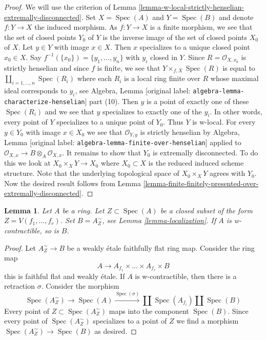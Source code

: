 \documentclass[10pt,a4paper]{article}
\theoremstyle{plain}
\newtheorem{lemma}[subsection]{Lemma}
\theoremstyle{definition}
\theoremstyle{remark}
\numberwithin{equation}{subsection}
\def\Spec{\mathop{\mathrm{Spec}}}
\begin{document}
\begin{proof}
We will use the criterion of
Lemma \ref{lemma-w-local-strictly-henselian-extremally-disconnected}.
Set $X = \Spec(A)$ and $Y = \Spec(B)$ and denote $f : Y \to X$
the induced morphism.
As $f : Y \to X$ is a finite morphism, we see that the set of closed
points $Y_0$ of $Y$ is the inverse image of the set of closed points
$X_0$ of $X$. Let $y \in Y$ with image $x \in X$. Then
$x$ specializes to a unique closed point $x_0 \in X$.
Say $f^{-1}(\{x_0\}) = \{y_1, \ldots, y_n\}$ with $y_i$
closed in $Y$. Since $R = \mathcal{O}_{X, x_0}$ is strictly henselian
and since $f$ is finite, we see that $Y \times_{f, X} \Spec(R)$ is
equal to $\coprod_{i = 1, \ldots, n} \Spec(R_i)$ where
each $R_i$ is a local ring finite over $R$
whose maximal ideal corresponds to $y_i$, see
Algebra, Lemma \textnormal{[original label: \nolinkurl{algebra-lemma-characterize-henselian}]} part (10).
Then $y$ is a point of exactly one of these $\Spec(R_i)$
and we see that $y$ specializes to exactly one of the $y_i$.
In other words, every point of $Y$ specializes to a unique
point of $Y_0$. Thus $Y$ is w-local.
For every $y \in Y_0$ with image $x \in X_0$
we see that $\mathcal{O}_{Y, y}$ is strictly henselian by
Algebra, Lemma \textnormal{[original label: \nolinkurl{algebra-lemma-finite-over-henselian}]}
applied to $\mathcal{O}_{X, x} \to B \otimes_A \mathcal{O}_{X, x}$.
It remains to show that $Y_0$ is extremally disconnected.
To do this we look at $X_0 \times_X Y \to X_0$
where $X_0 \subset X$ is the reduced induced scheme structure.
Note that the underlying topological space of
$X_0 \times_X Y$ agrees with $Y_0$. Now the desired result follows from
Lemma \ref{lemma-finite-finitely-presented-over-extremally-disconnected}.
\end{proof}

\begin{lemma}
\label{lemma-localization-w-contractible}
Let $A$ be a ring. Let $Z \subset \Spec(A)$ be a closed subset
of the form $Z = V(f_1, \ldots, f_r)$. Set $B = A_Z^\sim$, see
Lemma \ref{lemma-localization}. If $A$ is w-contractible, so is $B$.
\end{lemma}

\begin{proof}
Let $A_Z^\sim \to B$ be a weakly \'etale faithfully flat ring map.
Consider the ring map
$$
A \longrightarrow A_{f_1} \times \ldots \times A_{f_r} \times B
$$
this is faithful flat and weakly \'etale. If $A$ is w-contractible,
then there is a retraction $\sigma$. Consider the morphism
$$
\Spec(A_Z^\sim) \to \Spec(A) \xrightarrow{\Spec(\sigma)}
\coprod \Spec(A_{f_i}) \amalg \Spec(B)
$$
Every point of $Z \subset \Spec(A_Z^\sim)$ maps into the component
$\Spec(B)$. Since every point of $\Spec(A_Z^\sim)$ specializes to a
point of $Z$ we find a morphism $\Spec(A_Z^\sim) \to \Spec(B)$
as desired.
\end{proof}
\end{document}
